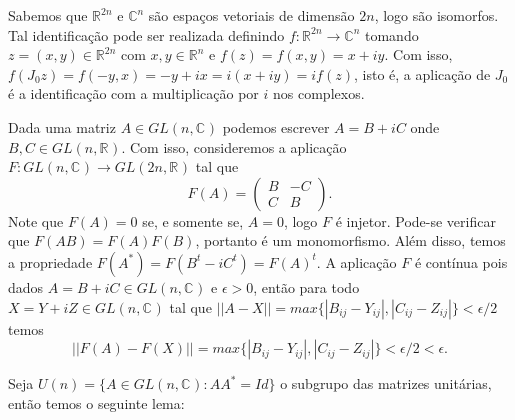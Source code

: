 \documentclass[12pt]{book}
\newcommand{\complexo}[1]{\mathbb{C}^{#1}}
\newcommand{\estruturacomplexa}{J_{0}}
\newcommand{\generalgroup}[2]{GL(#1, #2)}
\newcommand{\generalgroupreal}[1]{\generalgroup{#1}{\real{}}}
\newcommand{\generalgroupcomplexo}[1]{\generalgroup{#1}{\complexo{}}}
\newcommand{\matrizunitaria}[1]{U(#1)}
\newcommand{\real}[1]{\mathbb{R}^{#1}}
\begin{document}
	Sabemos que $\real{2n}$ e $\mathbb{C}^{n}$ são espaços vetoriais de dimensão $2n$, logo são isomorfos. Tal identificação pode ser realizada definindo $f:\real{2n}\to \complexo{n}$ tomando $z=(x,y) \in \real{2n}$ com $x,y \in \real{n}$ e $f(z) = f(x,y) =x+iy $. Com isso, $f(\estruturacomplexa z) = f(-y, x) = -y +ix = i(x+iy) = if(z)$, isto é, a aplicação de $\estruturacomplexa$ é a identificação com a multiplicação por $i$ nos complexos. 
	
	Dada uma matriz $A \in \generalgroupcomplexo{n}$ podemos escrever $A = B+iC$ onde $B,C \in \generalgroupreal{n}$. Com isso, consideremos a aplicação $F:\generalgroupcomplexo{n} \to \generalgroupreal{2n}$ tal que 
	$$
	F(A)=
	\left(
	\begin{array}{cc}
	B & -C
	\\
	C & B
	\end{array}
	\right).
	$$
	Note que $F(A) = 0$ se, e somente se, $A=0$, logo $F$ é injetor. Pode-se verificar que $F(AB)=F(A)F(B)$, portanto é um monomorfismo. Além disso, temos a propriedade $F(A^{*}) = F(B^{t} - iC^{t}) = F(A)^{t}$. A aplicação $F$ é contínua pois dados $A=B+iC \in \generalgroupcomplexo{n}$ e $\epsilon > 0$, então para todo $X= Y+iZ \in \generalgroupcomplexo{n}$ tal que $||A - X||=max \{|B_{ij} - Y_{ij}|,  |C_{ij} - Z_{ij}|\} < \epsilon/2$ temos
	$$
	||F(A) - F(X)|| = max \{|B_{ij} - Y_{ij}|, |C_{ij} - Z_{ij}| \}< \epsilon/2 < \epsilon.
	$$

	Seja $\matrizunitaria{n} = \{A\in \generalgroupcomplexo{n}: AA^{*}=Id \}$ o subgrupo das matrizes unitárias, então temos o seguinte lema:
	
\end{document}
